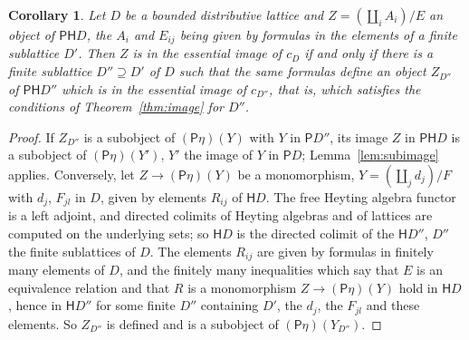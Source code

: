 \documentclass[11pt]{amsart}
\newtheorem{cor}[thm]{Corollary}
\theoremstyle{definition}
\newcommand{\PP}{\mathsf P}
\newcommand{\HH}{\mathsf H}
\begin{document}
\begin{cor}\label{cor:allD}
Let $D$ be a bounded distributive lattice and $Z=(\coprod_iA_i)/E$ an
object of $\PP\HH D$, the $A_i$ and $E_{ij}$ being given by formulas in
the elements of a finite sublattice $D'$. Then $Z$ is in the essential
image of $c_D$ if and only if there is a finite sublattice $D''\supseteq
D'$ of $D$ such that the same formulas define an object $Z_{D''}$ of
$\PP\HH D''$ which is in the essential image of $c_{D''}$, that is,
which satisfies the conditions of Theorem~\ref{thm:image} for $D''$.
\end{cor}
\begin{proof}
If $Z_{D''}$ is a subobject of $(\PP\eta)(Y)$ with $Y$ in $\PP D''$,
its image $Z$ in $\PP\HH D$ is a subobject of $(\PP\eta)(Y')$, $Y'$ the
image of $Y$ in $\PP D$; Lemma~\ref{lem:subimage} applies. Conversely,
let $Z\to(\PP\eta)(Y)$ be a monomorphism, $Y=(\coprod_jd_j)/F$ with
$d_j$, $F_{jl}$ in $D$, given by elements $R_{ij}$ of $\HH D$. The
free Heyting algebra functor is a left adjoint, and directed colimits
of Heyting algebras and of lattices are computed on the underlying
sets; so $\HH D$ is the directed colimit of the $\HH D''$, $D''$ the
finite sublattices of $D$. The elements $R_{ij}$ are given by formulas
in finitely many elements of $D$, and the finitely many inequalities
which say that $E$ is an equivalence relation and that $R$ is a
monomorphism $Z\to(\PP\eta)(Y)$ hold in $\HH D$, hence in $\HH D''$ for
some finite $D''$ containing $D'$, the $d_j$, the $F_{jl}$ and these
elements. So $Z_{D''}$ is defined and is a subobject of
$(\PP\eta)(Y_{D''})$.
\end{proof}
\end{document}
